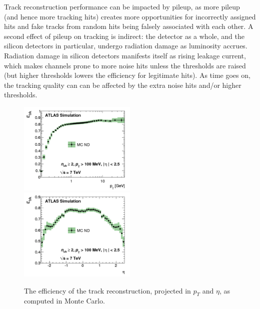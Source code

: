 Track reconstruction performance can be impacted by pileup, as more pileup (and hence more tracking hits) creates more opportunities for incorrectly assigned hits and fake tracks from random hits being falsely associated with each other.  A second effect of pileup on tracking is indirect: the detector as a whole, and the silicon detectors in particular, undergo radiation damage as luminosity accrues.  Radiation damage in silicon detectors manifests itself as rising leakage current, which makes channels prone to more noise hits unless the thresholds are raised (but higher thresholds lowers the efficiency for legitimate hits).  As time goes on, the tracking quality can can be affected by the extra noise hits and/or higher thresholds.

\begin{figure}
	\includegraphics[width=0.5\textwidth]{ReconstructionPerformance/images/track_perf1.pdf}
	\includegraphics[width=0.5\textwidth]{ReconstructionPerformance/images/track_perf2.pdf}
	\label{fig:track_perfA}  
	\caption{The efficiency of the track reconstruction, projected in $p_T$ and $\eta$, as computed in Monte Carlo.}
\end{figure}




